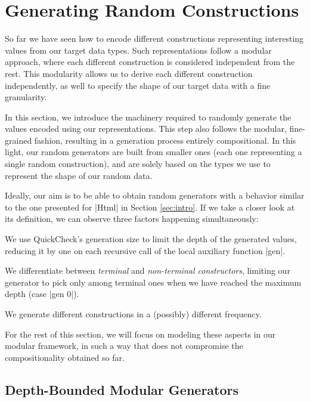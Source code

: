 \section{Generating Random Constructions}
\label{sec:generators}

%
So far we have seen how to encode different constructions representing
interesting values from our target data types.
%
Such representations follow a modular approach, where each different
construction is considered independent from the rest.
%
This modularity allows us to derive each different construction independently,
as well to specify the shape of our target data with a fine granularity.


In this section, we introduce the machinery required to randomly generate the
values encoded using our representations.
%
This step also follows the modular, fine-grained fashion, resulting in a
generation process entirely compositional.
%
In this light, our random generators are built from smaller ones (each one
representing a single random construction), and are solely based on the types we
use to represent the shape of our random data.


Ideally, our aim is to be able to obtain random generators with a behavior
similar to the one presented for |Html| in Section \ref{sec:intro}.
%
If we take a closer look at its definition, we can observe three factors
happening simultaneously:
%
\vspace{2pt}
\begin{CompactItemize}
\item We use QuickCheck's generation size to limit the depth of the generated
  values, reducing it by one on each recursive call of the local auxiliary
  function |gen|.
\item We differentiate between \emph{terminal} and \emph{non-terminal
    constructors}, limiting our generator to pick only among terminal ones when
  we have reached the maximum depth (case |gen 0|).
\item We generate different constructions in a (possibly) different frequency.
\end{CompactItemize}
%
For the rest of this section, we will focus on modeling these aspects in our
modular framework, in such a way that does not compromise the compositionality
obtained so far.


%
\subsection{Depth-Bounded Modular Generators}

